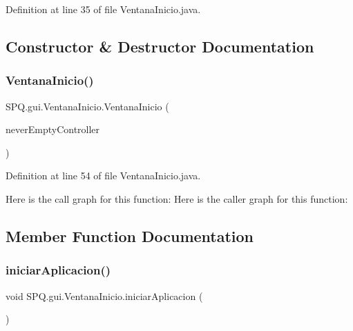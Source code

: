 Definition at line 35 of file Ventana\+Inicio.\+java.



\subsection{Constructor \& Destructor Documentation}
\mbox{\label{class_s_p_q_1_1gui_1_1_ventana_inicio_ab74166cbe23810e4b8586849fb86b54e}} 
\subsubsection{\texorpdfstring{Ventana\+Inicio()}{VentanaInicio()}}
{\footnotesize\ttfamily S\+P\+Q.\+gui.\+Ventana\+Inicio.\+Ventana\+Inicio (\begin{DoxyParamCaption}\item[{\mbox{\hyperlink{class_s_p_q_1_1controller_1_1_never_empty_controller}{Never\+Empty\+Controller}}}]{never\+Empty\+Controller }\end{DoxyParamCaption})}



Definition at line 54 of file Ventana\+Inicio.\+java.

Here is the call graph for this function\+:
Here is the caller graph for this function\+:


\subsection{Member Function Documentation}
\mbox{\label{class_s_p_q_1_1gui_1_1_ventana_inicio_a0588d157580852e153c5dd2291645173}} 
\subsubsection{\texorpdfstring{iniciar\+Aplicacion()}{iniciarAplicacion()}}
{\footnotesize\ttfamily void S\+P\+Q.\+gui.\+Ventana\+Inicio.\+iniciar\+Aplicacion (\begin{DoxyParamCaption}{ }\end{DoxyParamCaption})}




